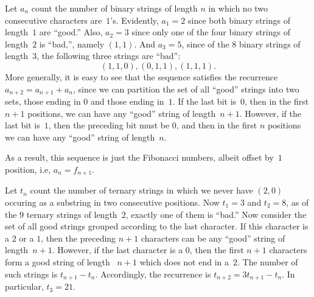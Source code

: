 \begin{example}\label{ex:recurrence:binary-strings-no-11}
Let $a_{n}$ count the number of binary strings of length $n$
in which no two consecutive characters are~$1$'s.  Evidently,
$a_1=2$ since both binary strings of length~$1$ are ``good.''  Also,
$a_2=3$ since only one of the four binary strings of length~$2$ is
``bad,'', namely $(1,1)$. And $a_3= 5$, since of the $8$ binary
strings of length~$3$, the following three strings are ``bad'':
\[
(1,1,0), (0,1,1), (1,1,1).  
\]
More generally, it is easy to see that the sequence satisfies the
recurrence $a_{n+2} = a_{n+1}+a_n$, since we can partition the set of
all ``good'' strings into two sets, those ending in $0$ and those
ending in~$1$.  If the last bit is~$0$, then in the first $n+1$
positions, we can have any ``good'' string of length~$n+1$.  However,
if the last bit is~$1$, then the preceding bit must be $0$, and then
in the first $n$ positions we can have any ``good'' string of
length~$n$.

As a result, this sequence is just the Fibonacci numbers, albeit
offset by~$1$ position, i.e, $a_{n} = f_{n+1}$.
\end{example}

\begin{example}\label{ex:recurrence:ternary-strings-no-20}
  Let $t_n$ count the number of ternary strings in which we never have
  $(2,0)$ occuring as a substring in two consecutive positions.  Now
  $t_1=3$ and $t_2=8$, as of the $9$ ternary strings of length~$2$,
  exactly one of them is ``bad.''  Now consider the set of all good
  strings grouped according to the last character.  If this character
  is a $2$ or a $1$, then the preceding $n+1$ characters can be any
  ``good'' string of length~$n+1$.  However, if the last character is
  a $0$, then the first $n+1$ characters form a good string of length
  ~$n+1$ which does not end in a~$2$.  The number of such strings is
  $t_{n+1} - t_n$.  Accordingly, the recurrence is $t_{n+2} = 3t_{n+1}
  - t_n$.  In particular, $t_3 = 21$.
\end{example}

